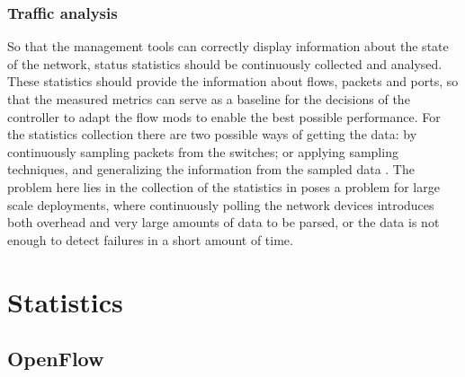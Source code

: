 \subsubsection {Traffic analysis}

So that the management tools can correctly display information about the state of the network, status statistics should be continuously collected and analysed. These statistics should provide the information about flows, packets
and ports, so that the measured metrics can serve as a baseline for the decisions of the controller to adapt the flow mods to enable the best possible performance. For the statistics collection there are two possible ways of 
getting the data: by continuously sampling packets from the switches; or applying sampling techniques, and generalizing the information from the sampled data \cite{CITE - low_overhead_te_elephants_detec}. The problem here lies
in the collection of the statistics in poses a problem for large scale deployments, where continuously polling the network devices introduces both overhead and very large amounts of data to be parsed, or the data is not enough
to detect failures in a short amount of time.

\section {Statistics}

\subsection {OpenFlow}


